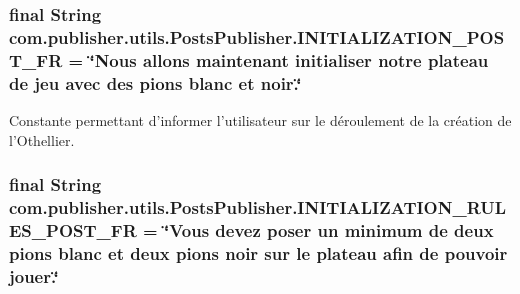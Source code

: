 \hypertarget{interfacecom_1_1publisher_1_1utils_1_1PostsPublisher_a6ee7f46f5a4b136c2f6947439a999555}{
\subsubsection[{I\-N\-I\-T\-I\-A\-L\-I\-Z\-A\-T\-I\-O\-N\-\_\-\-P\-O\-S\-T\-\_\-\-F\-R}]{\setlength{\rightskip}{0pt plus 5cm}final String com.\-publisher.\-utils.\-Posts\-Publisher.\-I\-N\-I\-T\-I\-A\-L\-I\-Z\-A\-T\-I\-O\-N\-\_\-\-P\-O\-S\-T\-\_\-\-F\-R = \char`\"{}Nous allons maintenant initialiser notre plateau de jeu avec des pions blanc et noir.\char`\"{}\hspace{0.3cm}{\ttfamily [static]}}}\label{interfacecom_1_1publisher_1_1utils_1_1PostsPublisher_a6ee7f46f5a4b136c2f6947439a999555}
Constante permettant d'informer l'utilisateur sur le déroulement de la création de l'Othellier. \hypertarget{interfacecom_1_1publisher_1_1utils_1_1PostsPublisher_a3752365d52e5597a899eca33556b7e8d}{
\subsubsection[{I\-N\-I\-T\-I\-A\-L\-I\-Z\-A\-T\-I\-O\-N\-\_\-\-R\-U\-L\-E\-S\-\_\-\-P\-O\-S\-T\-\_\-\-F\-R}]{\setlength{\rightskip}{0pt plus 5cm}final String com.\-publisher.\-utils.\-Posts\-Publisher.\-I\-N\-I\-T\-I\-A\-L\-I\-Z\-A\-T\-I\-O\-N\-\_\-\-R\-U\-L\-E\-S\-\_\-\-P\-O\-S\-T\-\_\-\-F\-R = \char`\"{}Vous devez poser un minimum de deux pions blanc et deux pions noir sur le plateau afin de pouvoir jouer.\char`\"{}\hspace{0.3cm}{\ttfamily [static]}}}\label{interfacecom_1_1publisher_1_1utils_1_1PostsPublisher_a3752365d52e5597a899eca33556b7e8d}
